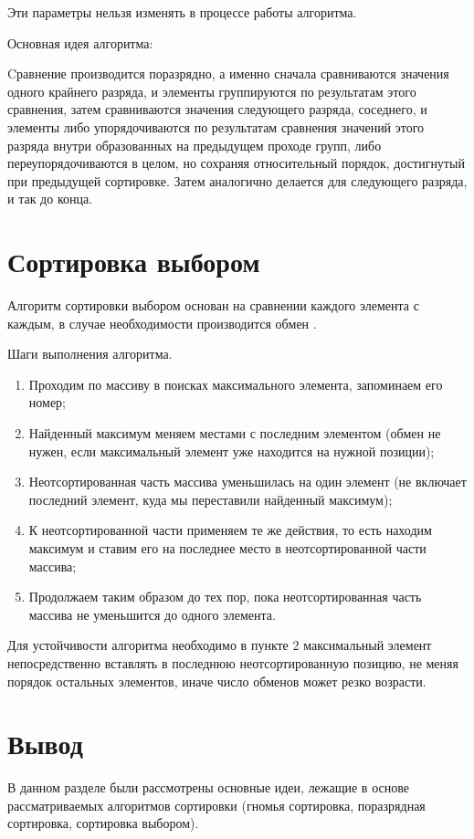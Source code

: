 Эти параметры нельзя изменять в процессе работы алгоритма.

Основная идея алгоритма:

Cравнение производится поразрядно, а именно сначала сравниваются значения одного крайнего разряда, и элементы группируются по результатам этого сравнения, затем сравниваются значения следующего разряда, соседнего, и элементы либо упорядочиваются по результатам сравнения значений этого разряда внутри образованных на предыдущем проходе групп, либо переупорядочиваются в целом, но сохраняя относительный порядок, достигнутый при предыдущей сортировке. Затем аналогично делается для следующего разряда, и так до конца.


\section{Сортировка выбором}
Алгоритм сортировки выбором основан на сравнении каждого элемента с каждым, в случае необходимости производится обмен \cite{select_sort}.

Шаги выполнения алгоритма.
\begin{enumerate}
    \item Проходим по массиву в поисках максимального элемента, запоминаем его номер;
    \item Найденный максимум меняем местами с последним элементом (обмен не нужен, если максимальный элемент уже находится на нужной позиции);
    \item Неотсортированная часть массива уменьшилась на один элемент (не включает последний элемент, куда мы переставили найденный максимум);
    \item К неотсортированной части применяем те же действия, то есть находим максимум и ставим его на последнее место в неотсортированной части массива;
	\item Продолжаем таким образом до тех пор, пока неотсортированная часть массива не уменьшится до одного элемента.
\end{enumerate}

Для устойчивости алгоритма необходимо в пункте 2 максимальный элемент непосредственно вставлять в последнюю неотсортированную позицию, не меняя порядок остальных элементов, иначе число обменов может резко возрасти.

\section*{Вывод}

В данном разделе были рассмотрены основные идеи, лежащие в основе рассматриваемых алгоритмов сортировки (гномья сортировка, поразрядная сортировка, сортировка выбором).